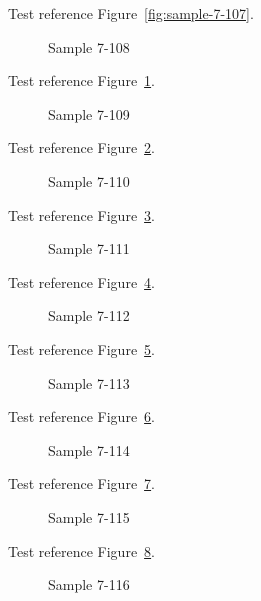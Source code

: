 Test reference Figure~\ref{fig:sample-7-107}.

\begin{figure}[tbhp]
\caption{Sample 7-108}
\label{fig:sample-7-108}
\end{figure}

Test reference Figure~\ref{fig:sample-7-108}.

\begin{figure}[tbhp]
\caption{Sample 7-109}
\label{fig:sample-7-109}
\end{figure}

Test reference Figure~\ref{fig:sample-7-109}.

\begin{figure}[tbhp]
\caption{Sample 7-110}
\label{fig:sample-7-110}
\end{figure}

Test reference Figure~\ref{fig:sample-7-110}.

\begin{figure}[tbhp]
\caption{Sample 7-111}
\label{fig:sample-7-111}
\end{figure}

Test reference Figure~\ref{fig:sample-7-111}.

\begin{figure}[tbhp]
\caption{Sample 7-112}
\label{fig:sample-7-112}
\end{figure}

Test reference Figure~\ref{fig:sample-7-112}.

\begin{figure}[tbhp]
\caption{Sample 7-113}
\label{fig:sample-7-113}
\end{figure}

Test reference Figure~\ref{fig:sample-7-113}.

\begin{figure}[tbhp]
\caption{Sample 7-114}
\label{fig:sample-7-114}
\end{figure}

Test reference Figure~\ref{fig:sample-7-114}.

\begin{figure}[tbhp]
\caption{Sample 7-115}
\label{fig:sample-7-115}
\end{figure}

Test reference Figure~\ref{fig:sample-7-115}.

\begin{figure}[tbhp]
\caption{Sample 7-116}
\label{fig:sample-7-116}
\end{figure}

